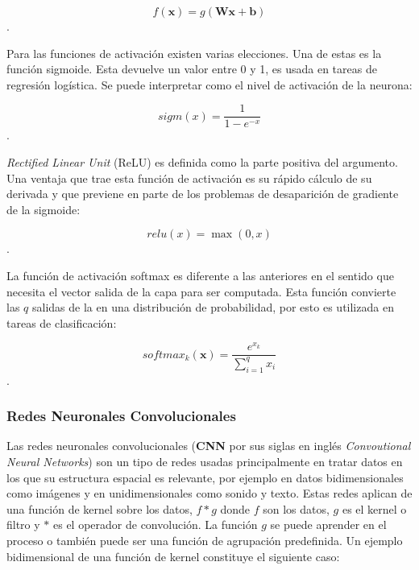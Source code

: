 \begin{equation}
	f(\textbf{x}) = g(\textbf{Wx} + \textbf{b})
\end{equation}\label{eq:dense}.

Para las funciones de activación existen varias elecciones. Una de estas es la función sigmoide. 
Esta devuelve un valor entre 0 y 1, es usada en tareas de regresión logística. 
Se puede interpretar como el nivel de activación de la neurona:

\begin{equation}
	sigm(x) = \frac{1}{1-e^{-x}}
\end{equation}\label{eq:sigmoide}.

\emph{Rectified Linear Unit} (ReLU) es definida como la parte positiva del argumento. Una ventaja que trae esta 
función de activación es su rápido cálculo de su derivada y que previene en parte de los problemas 
de desaparición de gradiente de la sigmoide:

\begin{equation}
	relu(x) = \max(0, x)
\end{equation}\label{eq:relu}.

La función de activación softmax es diferente a las anteriores en el sentido que necesita
el vector salida de la capa para ser computada. Esta función convierte las $q$ salidas
de la en una distribución de probabilidad, por esto es utilizada en tareas de clasificación:

\begin{equation}
	softmax_k(\textbf{x}) = \frac{e^{x_k}}{\sum_{i=1}^q x_i}
\end{equation}\label{eq:softmax}.

\subsubsection{Redes Neuronales Convolucionales}

Las redes neuronales convolucionales (\textbf{CNN} por sus siglas en inglés \emph{Convoutional Neural Networks}) 
son un tipo de redes usadas
principalmente en tratar datos en los que su estructura espacial es relevante, por ejemplo
en datos bidimensionales como imágenes y en unidimensionales como sonido y texto.
Estas redes aplican de una función de kernel sobre los datos, $f * g$ donde $f$ son los
datos, $g$ es el kernel o filtro y $*$ es el operador de convolución. La función $g$ se puede 
aprender en el proceso o también puede ser una función de agrupación predefinida. 
Un ejemplo bidimensional de una función de kernel constituye el siguiente caso:

